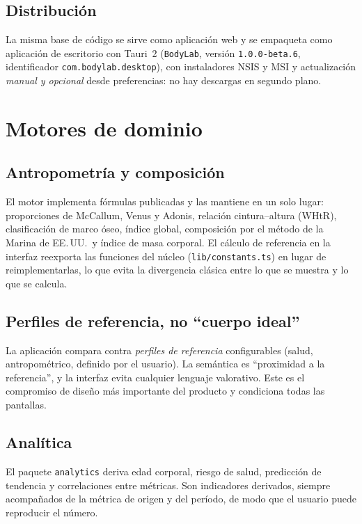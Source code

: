 \documentclass[conference]{IEEEtran}
\newcommand{\code}[1]{\texttt{\small #1}}
\begin{document}
\subsection{Distribuci\'on}
La misma base de c\'odigo se sirve como aplicaci\'on web y se empaqueta como
aplicaci\'on de escritorio con Tauri~2 (\code{BodyLab}, versi\'on
\code{1.0.0-beta.6}, identificador \code{com.bodylab.desktop}), con
instaladores NSIS y MSI y actualizaci\'on \emph{manual y opcional} desde
preferencias: no hay descargas en segundo plano.

\section{Motores de dominio}

\subsection{Antropometr\'ia y composici\'on}
El motor implementa f\'ormulas publicadas y las mantiene en un solo lugar:
proporciones de McCallum, Venus y Adonis, relaci\'on cintura--altura (WHtR),
clasificaci\'on de marco \'oseo, \'indice global, composici\'on por el m\'etodo
de la Marina de EE.\,UU.\ y \'indice de masa corporal. El c\'alculo de
referencia en la interfaz reexporta las funciones del n\'ucleo
(\code{lib/constants.ts}) en lugar de reimplementarlas, lo que evita la
divergencia cl\'asica entre lo que se muestra y lo que se calcula.

\subsection{Perfiles de referencia, no ``cuerpo ideal''}
La aplicaci\'on compara contra \emph{perfiles de referencia} configurables
(salud, antropom\'etrico, definido por el usuario). La sem\'antica es
``proximidad a la referencia'', y la interfaz evita cualquier lenguaje
valorativo. Este es el compromiso de dise\~no m\'as importante del producto y
condiciona todas las pantallas.

\subsection{Anal\'itica}
El paquete \code{analytics} deriva edad corporal, riesgo de salud,
predicci\'on de tendencia y correlaciones entre m\'etricas. Son indicadores
derivados, siempre acompa\~nados de la m\'etrica de origen y del per\'iodo, de
modo que el usuario puede reproducir el n\'umero.
\end{document}
